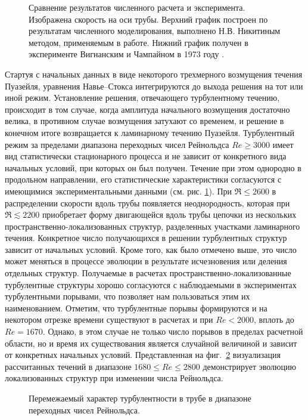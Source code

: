 \begin{figure}[h]
\caption{Сравнение результатов численного расчета и эксперимента. Изображена скорость на оси трубы. Верхний график построен по результатам численного моделирования, выполнено Н.В. Никитиным методом, применяемым в работе. Нижний график получен в эксперименте Вигнанским и Чампайном в 1973 году \cite{Wygnanski1973}.}
\label{exper_img}
\end{figure}

Стартуя с начальных данных в виде некоторого трехмерного возмущения течения Пуазейля, уравнения Навье--Стокса интегрируются до выхода решения на тот или иной режим. Установление решения, отвечающего турбулентному течению, происходит в том случае, когда амплитуда начального возмущения достаточно велика, в противном случае возмущения затухают со временем, и решение в конечном итоге возвращается к ламинарному течению Пуазейля. Турбулентный режим за пределами диапазона переходных чисел Рейнольдса $Re\geqslant3000$ имеет вид статистически стационарного процесса и не зависит от конкретного вида начальных условий, при которых он был получен. Течение при этом однородно в продольном направлении, его статистические характеристики согласуются с имеющимися экспериментальными данными (см. рис. \ref{exper_img}). При $\Re\leqslant2600$ в распределении скорости вдоль трубы появляется неоднородность, которая при $\Re\lesssim2200$ приобретает форму двигающейся вдоль трубы цепочки из нескольких пространственно-локализованных структур, разделенных участками ламинарного течения. Конкретное число получающихся в решении турбулентных структур зависит от начальных условий. Кроме того, как было отмечено выше, это число может меняться в процессе эволюции в результате исчезновения или деления отдельных структур. Получаемые в расчетах пространственно-локализованные турбулентные структуры хорошо согласуются с наблюдаемыми в экспериментах турбулентными порывами, что позволяет нам пользоваться этим их наименованием. Отметим, что турбулентные порывы формируются и на некотором отрезке времени существуют в расчетах и при $Re<2000$, вплоть до $Re=1670$. Однако, в этом случае не только число порывов в пределах расчетной области, но и время их существования является случайной величиной и зависит от конкретных начальных условий. Представленная на фиг.~\ref{puffs_img} визуализация рассчитанных течений в диапазоне $1680\leqslant Re\leqslant2800$ демонстрирует эволюцию локализованных структур при изменении числа Рейнольдса.

\begin{figure}[h]
\caption{Перемежаемый характер турбулентности в трубе в диапазоне переходных чисел Рейнольдса.}
\label{puffs_img}
\end{figure}

